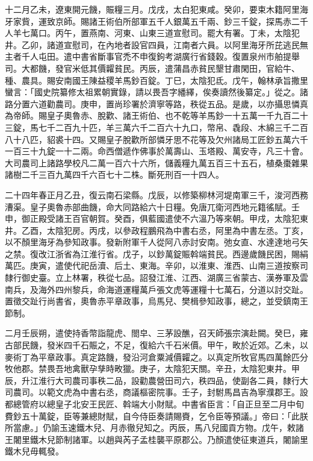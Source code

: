 \begin{pinyinscope}
 十二月乙未，遼東開元饑，賑糧三月。戊戌，太白犯東咸。癸卯，要束木籍阿里海牙家貲，運致京師。賜諸王術伯所部軍五千人銀萬五千兩、鈔三千錠，探馬赤二千人羊七萬口。丙午，置燕南、河東、山東三道宣慰司。罷大有署。丁未，太陰犯井。乙卯，諸道宣慰司，在內地者設官四員，江南者六員。以阿里海牙所芘逃民無主者千人屯田。遣中書省斷事官禿不申復鉤考湖廣行省錢穀。復置泉州市舶提舉司。大都饑，發官米低其價糶貧民。丙辰，遣蒲昌赤貧民墾甘肅閑田，官給牛、種、農具。賜安南國王陳益稷羊馬鈔百錠。丁巳，太陰犯氐。戊午，翰林承旨撒里蠻言：「國史院纂修太祖累朝實錄，請以畏吾字繙繹，俟奏讀然後纂定。」從之。諸路分置六道勸農司。庚申，置尚珍署於濟寧等路，秩從五品。是歲，以亦攝思憐真為帝師。賜皇子奧魯赤、脫歡、諸王術伯、也不乾等羊馬鈔一十五萬一千九百二十三錠，馬七千二百九十匹，羊三萬六千二百六十九口，幣帛、毳段、木綿三千二百八十八匹，貂裘十四。又賜皇子脫歡所部憐牙思不花等及欠州諸局工匠鈔五萬六千一百三十九錠一十二兩。命西僧遞作佛事於萬壽山、玉塔殿、萬安寺，凡三十會。大司農司上諸路學校凡二萬一百六十六所，儲義糧九萬五百三十五石，植桑棗雜果諸樹二千三百九萬四千六百七十二株。斷死刑百一十四人。



 二十四年春正月乙丑，復云南石梁縣。戊辰，以修築柳林河堤南軍三千，浚河西務漕渠。皇子奧魯赤部曲饑，命大同路給六十日糧。免唐兀衛河西地元籍徭賦。壬申，御正殿受諸王百官朝賀。癸酉，俱藍國遣使不六溫乃等來朝。甲戌，太陰犯東井。乙酉，太陰犯房。丙戌，以參政程鵬飛為中書右丞，阿里為中書左丞。丁亥，以不顏里海牙為參知政事。發新附軍千人從阿八赤討安南。弛女直、水達達地弓矢之禁。復改江浙省為江淮行省。戊子，以鈔萬錠賑斡端貧民。西邊歲饑民困，賜絹萬匹。庚寅，遣使代祀岳瀆、后土、東海。辛卯，以淮東、淮西、山南三道按察司隸行御史臺。立上林署，秩從七品。詔發江淮、江西、湖廣三省蒙古、漢券軍及雲南兵，及海外四州黎兵，命海道運糧萬戶張文虎等運糧十七萬石，分道以討交趾。置徵交趾行尚書省，奧魯赤平章政事，烏馬兒、樊楫參知政事，總之，並受鎮南王節制。



 二月壬辰朔，遣使持香幣詣龍虎、閤皁、三茅設醮，召天師張宗演赴闕。癸巳，雍古部民饑，發米四千石賑之，不足，復給六千石米價。甲午，畋於近郊。乙未，以麥術丁為平章政事。真定路饑，發沿河倉粟減價糶之。以真定所牧官馬四萬餘匹分牧他郡。禁畏吾地禽獸孕孳時畋獵。庚子，太陰犯天關。辛丑，太陰犯東井。甲辰，升江淮行大司農司事秩二品，設勸農營田司六，秩四品，使副各二員，隸行大司農司。以範文虎為中書右丞，商議樞密院事。壬子，封駙馬昌吉為寧濮郡王。設都總管府以總皇子北安王民匠、斡端大小財賦。中書省臣言：「自正旦至二月中旬費鈔五十萬錠，臣等兼總財賦，自今侍臣奏請賜賚，乞令臣等預議。」帝曰：「此朕所當慮。」仍諭玉速鐵木兒、月赤徹兒知之。丙辰，馬八兒國貢方物。戊午，敕諸王闍里鐵木兒節制諸軍。以趙與芮子孟桂襲平原郡公。乃顏遣使征東道兵，闍諭里鐵木兒毋輒發。




\end{pinyinscope}
